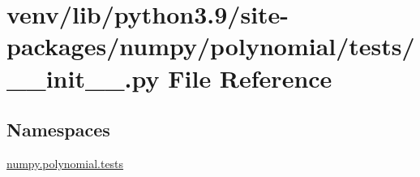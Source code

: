 \hypertarget{venv_2lib_2python3_89_2site-packages_2numpy_2polynomial_2tests_2____init_____8py}{}\section{venv/lib/python3.9/site-\/packages/numpy/polynomial/tests/\+\_\+\+\_\+init\+\_\+\+\_\+.py File Reference}
\label{venv_2lib_2python3_89_2site-packages_2numpy_2polynomial_2tests_2____init_____8py}
\subsection*{Namespaces}
\begin{DoxyCompactItemize}
\item 
 \hyperlink{namespacenumpy_1_1polynomial_1_1tests}{numpy.\+polynomial.\+tests}
\end{DoxyCompactItemize}
